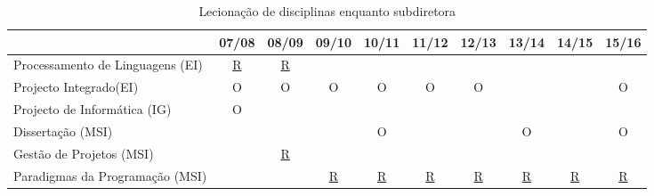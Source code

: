 \documentclass[11pt]{article}
\begin{document}
\begin{table}[h]
\scriptsize
\centering
    \begin{tabular}[h]{|l||c|c|c|c|c|c|c|c|c|}
      \hline
 & 07/08 & 08/09 & 09/10 & 10/11 & 11/12 & 12/13 & 13/14 & 14/15 & 15/16\\
\hline
\hline
Processamento de Linguagens (EI) & \href{run:Disciplinas/Fichas/PL0708.pdf}{R} & \href{run:Disciplinas/Fichas/PL0809.pdf}{R} & & & & & & &\\
\hline
Projecto Integrado(EI) & O & O & O & O & O & O & & & O\\
\hline
Projecto de Informática (IG) & O & & & & & & & &\\
\hline
Dissertação (MSI) & & & & O & & & O & & O\\
\hline
Gestão de Projetos (MSI) & & \href{run:Disciplinas/Fichas/GestaoProjetos.pdf}{R} & & & & & & &\\ 
\hline
Paradigmas da Programação (MSI) & & & \href{run:Disciplinas/Fichas/PP0910.pdf}{R} & \href{run:Disciplinas/Fichas/PP1011.pdf}{R} & \href{run:Disciplinas/Fichas/PP1112.pdf}{R} & \href{run:Disciplinas/Fichas/PP1213.pdf}{R} & \href{run:Disciplinas/Fichas/PP134.pdf}{R} & \href{run:Disciplinas/Fichas/PP1415.pdf}{R} & \href{run:Disciplinas/Fichas/PP1516.pdf}{R}\\
\hline
\end{tabular}
    \caption{Lecionação de disciplinas enquanto subdiretora}
    \label{disciplinas3}
\normalsize
\end{table}
\end{document}
